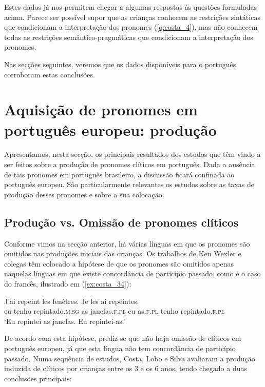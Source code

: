 \documentclass[output=paper]{LSP/langsci}
\begin{document}
Estes dados já nos permitem chegar a algumas respostas às questões formuladas acima. Parece ser possível supor que as crianças conhecem as restrições sintáticas que condicionam a interpretação dos pronomes (\ref{q:costa_4}), mas não conhecem todas as restrições semântico-pragmáticas que condicionam a interpretação dos pronomes.

Nas secções seguintes, veremos que os dados disponíveis para o português corroboram estas conclusões.


\section{Aquisição de pronomes em português europeu: produção}
\label{sec:costa_aquisicao_pe}

Apresentamos, nesta secção, os principais resultados dos estudos que têm vindo a ser feitos sobre a produção de pronomes clíticos em português. Dada a ausência de tais pronomes em português brasileiro, a discussão ficará confinada ao português europeu. São particularmente relevantes os estudos sobre as taxas de produção desses pronomes e sobre a sua colocação.

\subsection{Produção vs. Omissão de pronomes clíticos}
\label{subsec:costa_producao_omissao}

Conforme vimos na secção anterior, há várias línguas em que os pronomes são omitidos nas produções iniciais das crianças. Os trabalhos de Ken Wexler e colegas têm colocado a hipótese de que os pronomes são omitidos apenas naquelas línguas em que existe concordância de particípio passado, como é o caso do francês, ilustrado em (\ref{ex:costa_34}):

\ea\label{ex:costa_34}
\gll J'ai repeint les fenêtres. Je les ai repeintes.\\
{eu tenho} repintado.\textsc{m.sg} as janelas.\textsc{f.pl} eu as.\textsc{f.pl} tenho repintado.\textsc{f.pl}\\
\glt `Eu repintei as janelas. Eu repintei-as.'
\z

De acordo com esta hipótese, prediz-se que não haja omissão de clíticos em português europeu, já que esta língua não tem concordância de particípio passado. Numa sequência de estudos, Costa, Lobo e Silva \citep{costalobo2007,costalobo_etal2012,silva2008} avaliaram a produção induzida de clíticos por crianças entre os 3 e os 6 anos, tendo chegado a duas conclusões principais:
\end{document}

